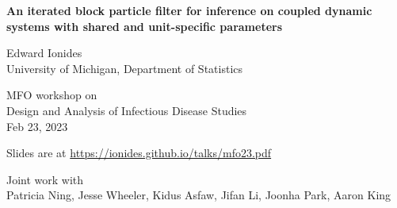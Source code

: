 \documentclass{beamer}
\begin{document}
\begin{frame}
  
\begin{center}
  {\Large\bf An iterated block particle filter for inference on coupled dynamic systems with shared and unit-specific parameters}


\vspace{2mm}

Edward Ionides\\
University of Michigan, Department of Statistics

\vspace{8mm}

MFO workshop on \\
Design and Analysis of Infectious Disease Studies
\\
Feb 23, 2023


\hspace{3mm}

Slides are at \url{https://ionides.github.io/talks/mfo23.pdf}

\vspace{8mm}

Joint work with\\
Patricia Ning, Jesse Wheeler, Kidus Asfaw, Jifan Li, Joonha Park, Aaron King

\end{center}

\end{frame}
\end{document}
